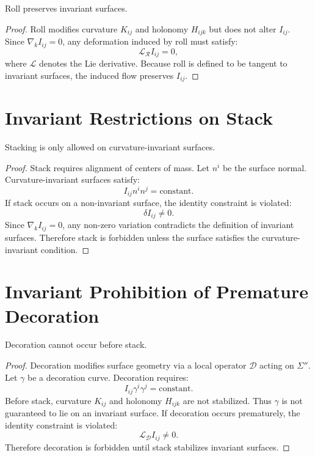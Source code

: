 \documentclass[12pt]{article}
\begin{document}
\begin{lemma}
Roll preserves invariant surfaces.
\end{lemma}

\begin{proof}
Roll modifies curvature $K_{ij}$ and holonomy $H_{ijk}$ but does not alter
$I_{ij}$. Since $\nabla_k I_{ij} = 0$, any deformation induced by roll must
satisfy:
\[
\mathcal{L}_{\mathcal{R}} I_{ij} = 0,
\]
where $\mathcal{L}$ denotes the Lie derivative. Because roll is defined to be
tangent to invariant surfaces, the induced flow preserves $I_{ij}$.
\end{proof}

\section{Invariant Restrictions on Stack}

\begin{lemma}
Stacking is only allowed on curvature-invariant surfaces.
\end{lemma}

\begin{proof}
Stack requires alignment of centers of mass. Let $n^i$ be the surface normal.
Curvature-invariant surfaces satisfy:
\[
I_{ij} n^i n^j = \text{constant}.
\]
If stack occurs on a non-invariant surface, the identity constraint is violated:
\[
\delta I_{ij} \neq 0.
\]
Since $\nabla_k I_{ij} = 0$, any non-zero variation contradicts the definition
of invariant surfaces. Therefore stack is forbidden unless the surface satisfies
the curvature-invariant condition.
\end{proof}

\section{Invariant Prohibition of Premature Decoration}

\begin{theorem}
Decoration cannot occur before stack.
\end{theorem}

\begin{proof}
Decoration modifies surface geometry via a local operator $\mathcal{D}$ acting
on $\Sigma''$. Let $\gamma$ be a decoration curve. Decoration requires:
\[
I_{ij} \gamma^i \gamma^j = \text{constant}.
\]
Before stack, curvature $K_{ij}$ and holonomy $H_{ijk}$ are not stabilized.
Thus $\gamma$ is not guaranteed to lie on an invariant surface. If decoration
occurs prematurely, the identity constraint is violated:
\[
\mathcal{L}_{\mathcal{D}} I_{ij} \neq 0.
\]
Therefore decoration is forbidden until stack stabilizes invariant surfaces.
\end{proof}
\end{document}
